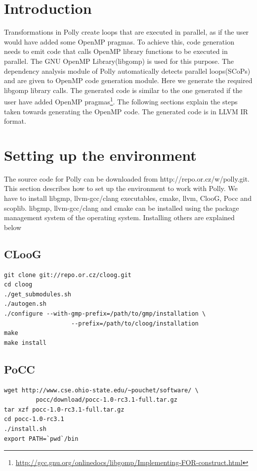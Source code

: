 \label{chap:openmp}

\section{Introduction}
Transformations in Polly create loops that are executed in parallel, as if the user would have
added some OpenMP pragmas. To achieve this, code generation needs to emit code that calls OpenMP
library functions to be executed in parallel. The GNU OpenMP Library(libgomp) is used for this purpose. The
dependency analysis module of Polly automatically detects parallel loops(SCoPs) and are given to OpenMP
code generation module. Here we generate the required libgomp library calls. The generated code is similar
to the one generated if the user have added OpenMP pragmas\footnote{\url{http://gcc.gnu.org/onlinedocs/libgomp/Implementing-FOR-construct.html}}.
The following sections explain the steps taken towards generating the OpenMP code. The generated code is in LLVM IR format.
\section{Setting up the environment}
The source code for Polly can be downloaded from http://repo.or.cz/w/polly.git. This section describes
how to set up the environment to work with Polly. We have to install libgmp, llvm-gcc/clang executables,
cmake, llvm, ClooG, Pocc and scoplib. libgmp, llvm-gcc/clang and cmake can be installed using the package
management system of the operating system. Installing others are explained below

\subsection{CLooG}
\begin{lstlisting}
git clone git://repo.or.cz/cloog.git
cd cloog
./get_submodules.sh
./autogen.sh
./configure --with-gmp-prefix=/path/to/gmp/installation \ 
                   --prefix=/path/to/cloog/installation
make
make install
\end{lstlisting}

\subsection{PoCC}
\begin{lstlisting}
wget http://www.cse.ohio-state.edu/~pouchet/software/ \
	     pocc/download/pocc-1.0-rc3.1-full.tar.gz
tar xzf pocc-1.0-rc3.1-full.tar.gz
cd pocc-1.0-rc3.1
./install.sh
export PATH=`pwd`/bin
\end{lstlisting}

